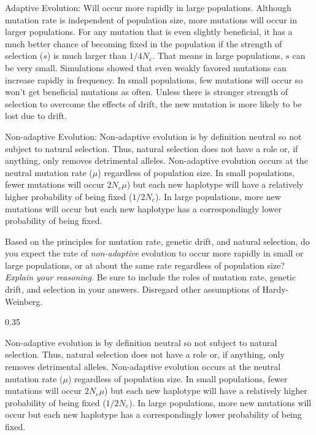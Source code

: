 \begin{solution}

Adaptive Evolution: Will occur more rapidly in large populations. Although mutation rate is independent of population size, more mutations will occur in larger populations. For any mutation that is even slightly beneficial, it has a much better chance of becoming fixed in the population if the strength of selection ($s$) is much larger than $1/4N_e$. That means in large populations, $s$ can be very small.   Simulations showed that even weakly favored mutations can increase rapidly in frequency.  In small populations, few mutations will occur so won't get beneficial mutations as often. Unless there is stronger strength of selection to overcome the effects of drift, the new mutation is more likely to be lost due to drift.

\vspace{\baselineskip}

Non-adaptive Evolution: Non-adaptive evolution is by definition neutral so not subject to natural selection. Thus, natural selection does not have a role or, if anything, only removes detrimental alleles. Non-adaptive evolution occurs at the neutral mutation rate ($\mu$) regardless of population size. In small populations, fewer mutations will occur $2N_e\mu$) but each new haplotype will have a relatively higher probability of being fixed ($1/2N_e$). In large populations, more new mutations will occur but each new haplotype has a correspondingly lower probability of being fixed.


\end{solution}

\question[10]
Based on the principles for mutation rate, genetic drift, and natural selection, do you expect the rate of \emph{non-adaptive} evolution to occur more rapidly in small or large populations, or at about the same rate regardless of population size? \emph{Explain your reasoning.} Be sure to include the roles of mutation rate, genetic drift, and selection in your answers. Disregard other assumptions of Hardy-Weinberg.

\begin{AnswerPage}{0.35\textheight}
	
	Non-adaptive evolution is by definition neutral so not subject to natural selection. Thus, natural selection does not have a role or, if anything, only removes detrimental alleles. Non-adaptive evolution occurs at the neutral mutation rate ($\mu$) regardless of population size. In small populations, fewer mutations will occur $2N_e\mu$) but each new haplotype will have a relatively higher probability of being fixed ($1/2N_e$). In large populations, more new mutations will occur but each new haplotype has a correspondingly lower probability of being fixed.
	
\end{AnswerPage}

